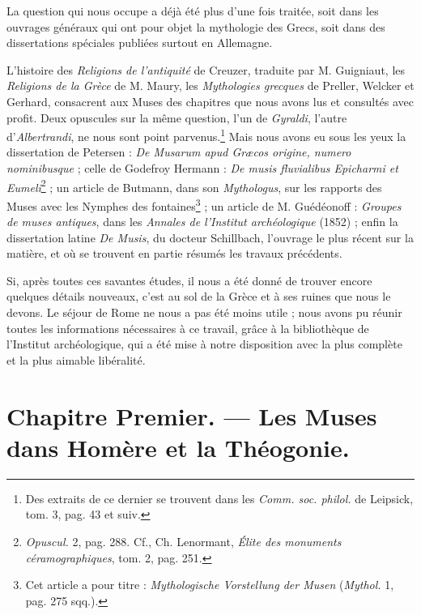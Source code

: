\documentclass[landscape, a4paper, 11pt, oneside, polutonikogreek, french]{article}
\begin{document}
La question qui nous occupe a déjà été plus d'une fois traitée, soit dans les ouvrages généraux qui ont pour objet la mythologie des Grecs, soit dans des dissertations spéciales publiées surtout en Allemagne.

L'histoire des \emph{Religions de l'antiquité} de Creuzer, traduite par M. Guigniaut, les \emph{Religions de la Grèce} de M. Maury, les \emph{Mythologies grecques} de Preller, Welcker et Gerhard, consacrent aux Muses des chapitres que nous avons lus et consultés avec profit. Deux opuscules sur la même question, l'un de \emph{Gyraldi}, l'autre d'\emph{Albertrandi}, ne nous sont point parvenus.\footnote{Des extraits de ce dernier se trouvent dans les \emph{Comm. soc. philol.} de Leipsick, tom. 3, pag. 43 et suiv.} Mais nous avons eu sous les yeux la dissertation de Petersen : \emph{De Musarum apud Græcos origine, numero nominibusque} ; celle de Godefroy Hermann : \emph{De musis fluvialibus Epicharmi et Eumeli}\footnote{\emph{Opuscul.} 2, pag. 288. Cf., Ch. Lenormant, \emph{Élite des monuments céramographiques}, tom. 2, pag. 251.} ; un article de Butmann, dans son \emph{Mythologus}, sur les rapports des Muses avec les Nymphes des fontaines\footnote{Cet article a pour titre : \emph{Mythologische Vorstellung der Musen} (\emph{Mythol.} 1, pag. 275 sqq.).} ; un article de M. Guédéonoff : \emph{Groupes de muses antiques}, dans les \emph{Annales de l'Institut archéologique} (1852) ; enfin la dissertation latine \emph{De Musis}, du docteur Schillbach, l'ouvrage le plus récent sur la matière, et où se trouvent en partie résumés les travaux précédents.

Si, après toutes ces savantes études, il nous a été donné de trouver encore quelques détails nouveaux, c'est au sol de la Grèce et à ses ruines que nous le devons. Le séjour de Rome ne nous a pas été moins utile ; nous avons pu réunir toutes les informations nécessaires à ce travail, grâce à la bibliothèque de l'Institut archéologique, qui a été mise à notre disposition avec la plus complète et la plus aimable libéralité.
\clearpage
\section{Chapitre Premier. --- Les Muses dans Homère et la Théogonie.}
\end{document}
